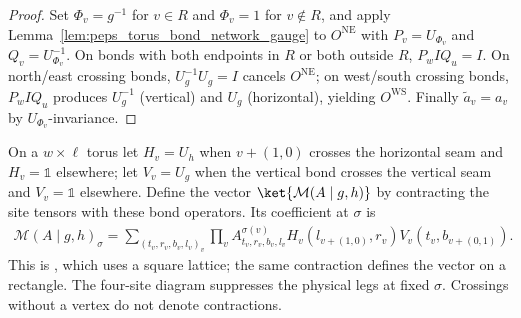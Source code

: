 \begin{proof}\leanok
    Set $\Phi_v=g^{-1}$ for $v\in R$ and $\Phi_v=1$ for $v\notin R$, and apply Lemma~\ref{lem:peps_torus_bond_network_gauge} to $O^{\mathrm{NE}}$ with $P_v=U_{\Phi_v}$ and $Q_v=U_{\Phi_v}^{-1}$. On bonds with both endpoints in $R$ or both outside $R$, $P_w I Q_u=I$. On north/east crossing bonds, $U_g^{-1}U_g=I$ cancels $O^{\mathrm{NE}}$; on west/south crossing bonds, $P_w I Q_u$ produces $U_g^{-1}$ (vertical) and $U_g$ (horizontal), yielding $O^{\mathrm{WS}}$. Finally $\widetilde a_v=a_v$ by $U_{\Phi_v}$-invariance.
\end{proof}

\begin{definition}%
    \label{def:peps_torus_g_closure}
    \leanok
    On a $w\times\ell$ torus let $H_v=U_h$ when $v+(1,0)$ crosses the
    horizontal seam and $H_v=\mathbb 1$ elsewhere; let $V_v=U_g$ when
    the vertical bond crosses the vertical seam and $V_v=\mathbb 1$
    elsewhere. Define the vector $\ket{\mathcal M(A\mid g,h)}$ by contracting
    the site tensors with these bond operators. Its coefficient at
    $\sigma$ is
    \begin{align}
        \mathcal M(A\mid g,h)_\sigma
        =\sum_{(t_v,r_v,b_v,l_v)_v}\prod_v
        A^{\sigma(v)}_{t_v,r_v,b_v,l_v}
        H_v(l_{v+(1,0)},r_v)V_v(t_v,b_{v+(0,1)}).
        \label{eq:peps_torus_closure_coeff}
    \end{align}
    This is \cite[Definition~5.6]{Schuch2010PEPS}, which uses a square
    lattice; the same contraction defines the vector on a rectangle.
    The four-site diagram suppresses the physical legs at fixed $\sigma$.
    Crossings without a vertex do not denote contractions.
\end{definition}

